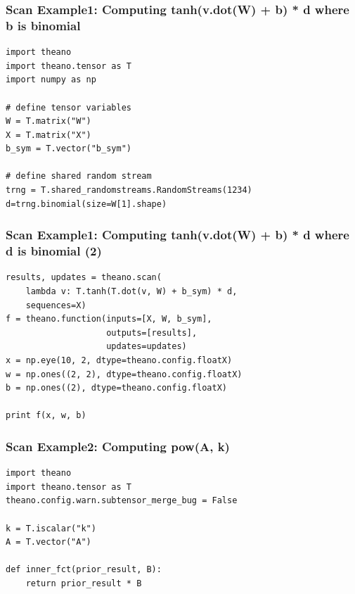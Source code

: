 \documentclass[utf8x,xcolor=pdftex,dvipsnames,table]{beamer}
\begin{document}
\begin{frame}[fragile]
  \frametitle{Scan Example1: Computing tanh(v.dot(W) + b) * d where b is binomial}

\begin{lstlisting}
import theano
import theano.tensor as T
import numpy as np

# define tensor variables
W = T.matrix("W")
X = T.matrix("X")
b_sym = T.vector("b_sym")

# define shared random stream
trng = T.shared_randomstreams.RandomStreams(1234)
d=trng.binomial(size=W[1].shape)
\end{lstlisting}
\end{frame}


\begin{frame}[fragile]
  \frametitle{Scan Example1: Computing tanh(v.dot(W) + b) * d where d is binomial (2)}

\begin{lstlisting}
results, updates = theano.scan(
    lambda v: T.tanh(T.dot(v, W) + b_sym) * d,
    sequences=X)
f = theano.function(inputs=[X, W, b_sym],
                    outputs=[results],
                    updates=updates)
x = np.eye(10, 2, dtype=theano.config.floatX)
w = np.ones((2, 2), dtype=theano.config.floatX)
b = np.ones((2), dtype=theano.config.floatX)

print f(x, w, b)
\end{lstlisting}
\end{frame}

\begin{frame}[fragile]
  \frametitle{Scan Example2: Computing pow(A, k)}

\begin{lstlisting}
import theano
import theano.tensor as T
theano.config.warn.subtensor_merge_bug = False

k = T.iscalar("k")
A = T.vector("A")

def inner_fct(prior_result, B):
    return prior_result * B
\end{lstlisting}
\end{frame}
\end{document}
